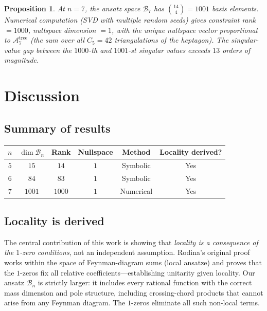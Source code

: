 \documentclass[11pt]{article}
\theoremstyle{plain}
\newtheorem{proposition}[theorem]{Proposition}
\theoremstyle{definition}
\newcommand{\cA}{\mathcal{A}}
\newcommand{\cB}{\mathcal{B}}
\begin{document}
\begin{proposition}
At $n = 7$, the ansatz space $\cB_7$ has $\binom{14}{4} = 1001$ basis elements.
Numerical computation (SVD with multiple random seeds) gives constraint rank $= 1000$,
nullspace dimension $= 1$, with the unique nullspace vector proportional to
$\cA_7^{\mathrm{tree}}$ (the sum over all $C_5 = 42$ triangulations of the heptagon).
The singular-value gap between the $1000$-th and $1001$-st singular values exceeds
$13$ orders of magnitude.
\end{proposition}

\section{Discussion}
\label{sec:discussion}

\subsection{Summary of results}

\begin{center}
\begin{tabular}{cccccc}
\toprule
$n$ & $\dim \cB_n$ & Rank & Nullspace & Method & Locality derived? \\
\midrule
$5$ & $15$   & $14$   & $1$ & Symbolic & Yes \\
$6$ & $84$   & $83$   & $1$ & Symbolic & Yes \\
$7$ & $1001$ & $1000$ & $1$ & Numerical & Yes \\
\bottomrule
\end{tabular}
\end{center}

\subsection{Locality is derived}

The central contribution of this work is showing that \emph{locality is a consequence
of the $1$-zero conditions}, not an independent assumption. Rodina's original proof
works within the space of Feynman-diagram sums (local ansatze) and proves that the
$1$-zeros fix all relative coefficients---establishing unitarity given locality. Our
ansatz $\cB_n$ is strictly larger: it includes every rational function with the
correct mass dimension and pole structure, including crossing-chord products that
cannot arise from any Feynman diagram. The $1$-zeros eliminate all such non-local
terms.
\end{document}
